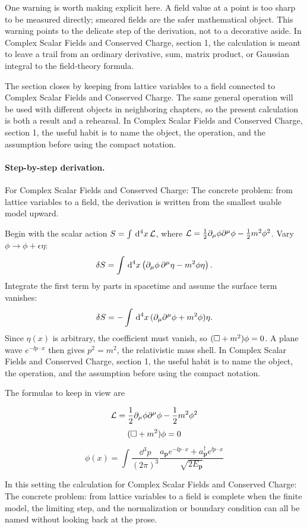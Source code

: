 One warning is worth making explicit here.  A field value at a point is too sharp to be measured directly; smeared fields are the safer mathematical object.  This warning points to the delicate step of the derivation, not to a decorative aside.  In Complex Scalar Fields and Conserved Charge, section 1, the calculation is meant to leave a trail from an ordinary derivative, sum, matrix product, or Gaussian integral to the field-theory formula.

The section closes by keeping from lattice variables to a field connected to Complex Scalar Fields and Conserved Charge.  The same general operation will be used with different objects in neighboring chapters, so the present calculation is both a result and a rehearsal.  In Complex Scalar Fields and Conserved Charge, section 1, the useful habit is to name the object, the operation, and the assumption before using the compact notation.



\paragraph{Step-by-step derivation.}

For Complex Scalar Fields and Conserved Charge: The concrete problem: from lattice variables to a field, the derivation is written from the smallest usable model upward.

Begin with the scalar action \(S=\int\,\mathrm d^4x\,\mathcal L\), where \(\mathcal L=\frac12\partial_\mu\phi\partial^\mu\phi-\frac12m^2\phi^2\).  Vary \(\phi\to\phi+\epsilon\eta\):
\[
  \delta S=\int\,\mathrm d^4x\left(\partial_\mu\phi\,\partial^\mu\eta-m^2\phi\eta\right).
\]
Integrate the first term by parts in spacetime and assume the surface term vanishes:
\[
  \delta S=-\int\,\mathrm d^4x\,(\partial_\mu\partial^\mu\phi+m^2\phi)\eta.
\]
Since \(\eta(x)\) is arbitrary, the coefficient must vanish, so \((\Box+m^2)\phi=0\).  A plane wave \(e^{-\ii p\cdot x}\) then gives \(p^2=m^2\), the relativistic mass shell.  In Complex Scalar Fields and Conserved Charge, section 1, the useful habit is to name the object, the operation, and the assumption before using the compact notation.

The formulas to keep in view are

\[
  \mathcal L=\frac12\partial_\mu\phi\partial^\mu\phi-\frac12m^2\phi^2
\]
\[
  (\Box+m^2)\phi=0
\]
\[
  \phi(x)=\int\frac{\dd^3p}{(2\pi)^3}\frac{a_{\bm p}e^{-\ii p\cdot x}+a_{\bm p}^\dagger e^{\ii p\cdot x}}{\sqrt{2E_{\bm p}}}
\]

In this setting the calculation for Complex Scalar Fields and Conserved Charge: The concrete problem: from lattice variables to a field is complete when the finite model, the limiting step, and the normalization or boundary condition can all be named without looking back at the prose.




